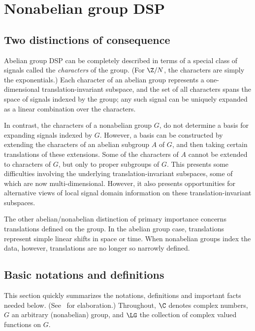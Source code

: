 \section{Nonabelian group DSP}
\subsection{Two distinctions of consequence}
Abelian group DSP can be completely described in terms of a
special class of signals called the \emph{characters} of the
group. (For $\Z/N$, the characters are simply the exponentials.)
Each character of an abelian group represents a one-dimensional
translation-invariant subspace, and the set of all characters
spans the space of signals indexed by the group; any such
signal can be uniquely expanded as a linear combination over
the characters.

In contrast, the characters of a nonabelian group $G$, %
do not determine a basis for expanding signals indexed by
$G$.  However, a basis can be constructed by extending the
characters of an abelian subgroup $A$ of $G$, and then taking
certain translations of these extensions.  Some of the
characters of $A$ cannot be extended to characters of $G$,
but only to proper subgroups of $G$.  This presents some
difficulties involving the underlying translation-invariant
subspaces, some of which are now multi-dimensional.
However, it also presents opportunities for alternative
views of local signal domain information on these
translation-invariant subspaces. 

The other abelian/nonabelian distinction of primary importance 
concerns translations defined on the group.  In the abelian group
case, translations represent simple linear shifts in space or time.
When nonabelian groups index the data, however, translations are no
longer so narrowly defined. 

\subsection{Basic notations and definitions}
This section quickly summarizes the notations,
definitions and important facts needed below.
(See~\cite{An:2003} for elaboration.)  Throughout, $\C$ denotes complex
numbers, $G$ an arbitrary (nonabelian) group, %
and $\LG$ the collection of complex valued functions on $G$.
  
